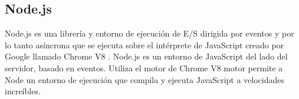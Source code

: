 
 



  

\subsection{Node.js}

Node.js \cite{URL::Nodejs} es una librería y entorno de ejecución de E/S dirigida por eventos y por lo tanto asíncrona que se ejecuta sobre el intérprete de JavaScript creado por Google llamado Chrome V8\cite{URL::ChromeV8} . Node.js es un entorno de JavaScript del lado del servidor, basado en eventos. Utiliza el motor de Chrome V8 motor permite a Node un entorno de ejecución que compila y ejecuta JavaScript a velocidades increíbles.

